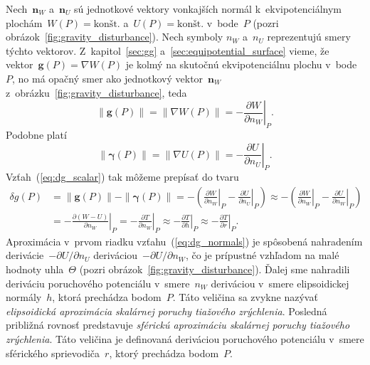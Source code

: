 \documentclass[a4paper, 12pt]{book}
\let\vec\mathbf
\begin{document}
Nech~$\vec n_W$ a~$\vec n_U$ sú jednotkové vektory vonkajších normál 
k~ekvipotenciálnym plochám~$W(P) = \textrm{konšt.}$ a~$U(P) = \textrm{konšt.}$ 
v~bode~$P$ (pozri obrázok~\ref{fig:gravity_disturbance}).  Nech symboly $n_W$ 
a~$n_U$ reprezentujú smery týchto vektorov.  Z~kapitol~\ref{sec:gg} 
a~\ref{sec:equipotential_surface} vieme, že vektor~$\vec g(P) = \nabla W(P)$ je 
kolmý na skutočnú ekvipotenciálnu plochu v~bode~$P$, no má opačný smer ako 
jednotkový vektor~$\vec n_W$ z~obrázku~\ref{fig:gravity_disturbance}, teda
%
\begin{equation}
\| \vec g(P) \| = \| \nabla W(P) \| = -\left.\frac{\partial W}{\partial 
n_W}\right|_P.
\end{equation}
%
Podobne platí
%
\begin{equation}
\| \boldsymbol \gamma(P) \| = \| \nabla U(P) \| = -\left.\frac{\partial 
U}{\partial n_U}\right|_P.
\end{equation}
%
Vzťah~(\ref{eq:dg_scalar}) tak môžeme prepísať do tvaru
%
\begin{equation}
\label{eq:dg_normals}
\begin{split}
\delta g(P) &= \| \vec g(P) \| - \| \boldsymbol\gamma(P) \| = -\left( 
\left.\frac{\partial W}{\partial n_W}\right|_P - \left.\frac{\partial 
U}{\partial n_U}\right|_P\right) \approx -\left( \left.\frac{\partial 
W}{\partial n_W}\right|_P - \left.\frac{\partial U}{\partial 
n_W}\right|_P\right)\\
%
&= -\left.\frac{\partial (W - U)}{\partial n_W}\right|_P 
=  -\left.\frac{\partial T}{\partial n_W}\right|_P \approx 
-\left.\frac{\partial T}{\partial h}\right|_P \approx -\left.\frac{\partial 
T}{\partial r}\right|_P{.}
\end{split}
\end{equation}
%
Aproximácia v~prvom riadku vzťahu~(\ref{eq:dg_normals}) je spôsobená nahradením 
derivácie~$-\partial U \slash \partial n_U$ deriváciou~$-\partial U \slash 
\partial n_W$, čo je prípustné vzhľadom na malé hodnoty uhla~$\Theta$ (pozri 
obrázok~\ref{fig:gravity_disturbance}).  Ďalej sme nahradili deriváciu 
poruchového potenciálu v~smere~$n_W$ deriváciou v~smere elipsoidickej 
normály~$h$, ktorá prechádza bodom~$P$.  Táto veličina sa zvykne nazývať 
\emph{elipsoidická aproximácia skalárnej poruchy tiažového zrýchlenia}.  
Posledná približná rovnosť predstavuje \emph{sférickú aproximáciu skalárnej 
poruchy tiažového zrýchlenia}.  Táto veličina je definovaná deriváciou 
poruchového potenciálu v~smere sférického sprievodiča~$r$, ktorý prechádza 
bodom~$P$.
\end{document}
